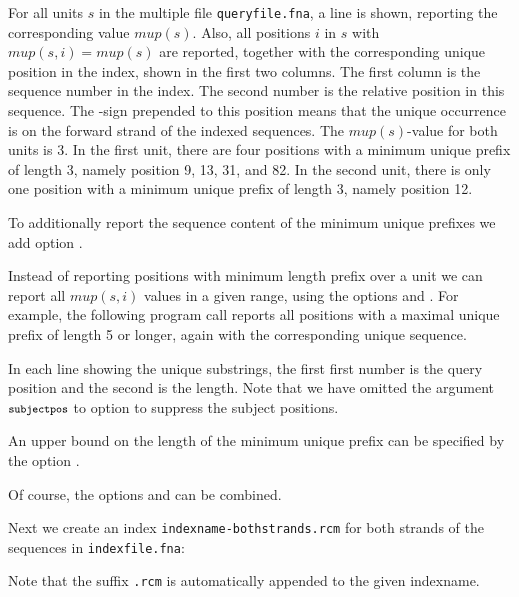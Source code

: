 \documentclass[12pt]{article}
\newcommand{\Mup}[1]{\mathit{mup(s,#1)}}
\newcommand{\Lmin}[0]{\mathit{mup(s)}}
\begin{document}
For all units \(s\) in the multiple \Fasta file \texttt{queryfile.fna},
a line is shown, reporting the corresponding value \(\Lmin\).
Also, all positions \(i\) in \(s\) with \(\Mup{i}=\Lmin\)
are reported, together with the corresponding unique position
in the index, shown in the first two columns. The first column is the
sequence number in the index. The second number is the relative position
in this sequence. The -sign prepended to this position
means that the unique occurrence is on the forward strand of the
indexed sequences. The \(\Lmin\)-value for both units is 3. In the first
unit, there are four positions with a minimum unique prefix of length 3,
namely position 9, 13, 31, and 82.
In the second unit, there is only one position with a minimum unique prefix
of length 3, namely position 12.

To additionally report the sequence content of the
minimum unique prefixes we add option .


Instead of reporting positions with minimum length prefix over a
unit we can report all \(\Mup{i}\) values in a
given range, using the options  and .
For example, the following program call reports all positions
with a maximal unique prefix of length 5 or longer, again
with the corresponding unique sequence.


In each line showing the unique substrings, the first first number is the 
query position and the second is the length. Note that we have omitted
the argument $\mbox{\footnotesize \texttt{subjectpos}}$ to option 
to suppress the subject positions.

An upper bound on the length of the minimum unique prefix can be specified 
by the option .


Of course, the options  and 
can be combined. 

Next we create an index \texttt{indexname-bothstrands.rcm}
for both strands of the sequences in \texttt{indexfile.fna}:


Note that the suffix \texttt{.rcm} is automatically appended to
the given indexname.
\end{document}
